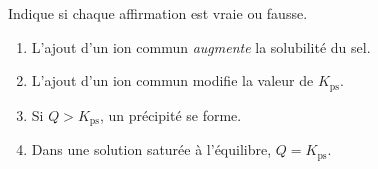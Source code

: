 \documentclass[11pt,a4paper]{article}
\begin{document}
\begin{exo}
Indique si chaque affirmation est vraie ou fausse.
\begin{enumerate}[label=\alph*)]
  \item L'ajout d'un ion commun \emph{augmente} la solubilité du sel.
  \item L'ajout d'un ion commun modifie la valeur de $K_{\mathrm{ps}}$.
  \item Si $Q>K_{\mathrm{ps}}$, un précipité se forme.
  \item Dans une solution saturée à l'équilibre, $Q=K_{\mathrm{ps}}$.
\end{enumerate}
\end{exo}
\end{document}
